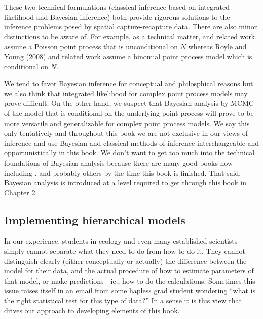 These two technical formulations (classical inference based on
integrated likelihood and Bayesian inference) both provide rigorous solutions to
the inference problems posed by spatial capture-recapture data.  There
are also minor distinctions to be aware of. For example,
as a technical matter, \citet{borchers_efford:2008} and related work, assume
a Poisson point process that is unconditional on $N$ whereas Royle and
Young (2008) and related work assume a binomial point process model
which is conditional on $N$.

We tend to favor Bayesian inference for conceptual and philosphical
reasons but we also think that  integrated likelihood
for complex point process models may prove difficult. On the other
hand, we suspect that Bayesian
analysis by MCMC
of the model that is conditional on the underlying point process will
prove to be more versatile and generalizable for complex point process
models. We say this only
tentatively and throughout this book we are not exclusive in our views
of inference and use Bayesian and classical methods of inference
interchangeable and opportunistically in this book.
We don't want to get too much into the technical foundations of
Bayesian analysis because there are many good books now including
\citet{link_barker:2010}.  \citet{kery:2010, mccarthy:2007,
  king_etal:2009} and probably others by the time this book is
finished. That said,  Bayesian analysis is introduced at a
level required to get through this book in Chapter 2.


\subsection{Implementing hierarchical models}

In our experience, students in ecology and even many established
scientists simply cannot separate what they need to do from how to do
it.  They cannot distinguish clearly (either conceptually or actually)
the difference between the model for their data, and the actual
procedure of how to estimate parameters of that model, or make
predictions - ie., how to do the calculations. Sometimes this issue
raises itself in an email from some hapless grad student wondering
``what is the right statistical test for this type of data?''  In a
sense it is this view that drives our approach to developing elements
of this book.

